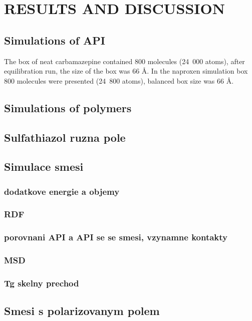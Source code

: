 \newpage
\section{RESULTS AND DISCUSSION}


\subsection{Simulations of API}
The box of neat carbamazepine contained 800 molecules (24~000 atoms), after equilibration run, the size of the box was 66 \r{A}. In the naproxen simulation box 800 molecules were presented (24~800 atoms), balanced box size was 66 \r{A}.



\subsection{Simulations of polymers}

\subsection{Sulfathiazol ruzna pole}

\subsection{Simulace smesi}

\subsubsection{dodatkove energie a objemy}

\subsubsection{RDF}
\subsubsection{porovnani API a API se se smesi, vzynamne kontakty}

\subsubsection{MSD}

\subsubsection{Tg skelny prechod}


\subsection{Smesi s polarizovanym polem}